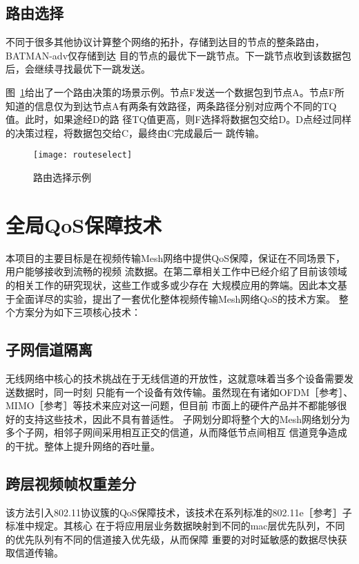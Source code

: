 \subsection{路由选择}
不同于很多其他协议计算整个网络的拓扑，存储到达目的节点的整条路由，BATMAN-adv仅存储到达
目的节点的最优下一跳节点。下一跳节点收到该数据包后，会继续寻找最优下一跳发送。

图~\ref{fig:routeselect}给出了一个路由决策的场景示例。节点F发送一个数据包到节点A。节点F所
知道的信息仅为到达节点A有两条有效路径，两条路径分别对应两个不同的TQ值。此时，如果途经D的路
径TQ值更高，则F选择将数据包交给D。D点经过同样的决策过程，将数据包交给C，最终由C完成最后一
跳传输。

\begin{figure}[H] %
  \centering
  \texttt{[image: routeselect]}
  \caption{路由选择示例}
  \label{fig:routeselect}
\end{figure}

\section{全局QoS保障技术}
本项目的主要目标是在视频传输Mesh网络中提供QoS保障，保证在不同场景下，用户能够接收到流畅的视频
流数据。在第二章相关工作中已经介绍了目前该领域的相关工作的研究现状，这些工作或多或少存在
大规模应用的弊端。因此本文基于全面详尽的实验，提出了一套优化整体视频传输Mesh网络QoS的技术方案。
整个方案分为如下三项核心技术：

\subsection{子网信道隔离}
    无线网络中核心的技术挑战在于无线信道的开放性，这就意味着当多个设备需要发送数据时，同一时刻
只能有一个设备有效传输。虽然现在有诸如OFDM［参考］、MIMO［参考］等技术来应对这一问题，但目前
市面上的硬件产品并不都能够很好的支持这些技术，因此不具有普适性。
    子网划分即将整个大的Mesh网络划分为多个子网，相邻子网间采用相互正交的信道，从而降低节点间相互
信道竞争造成的干扰。整体上提升网络的吞吐量。

\subsection{跨层视频帧权重差分}
    该方法引入802.11协议簇的QoS保障技术，该技术在系列标准的802.11e［参考］子标准中规定。其核心
在于将应用层业务数据映射到不同的mac层优先队列，不同的优先队列有不同的信道接入优先级，从而保障
重要的对时延敏感的数据尽快获取信道传输。

